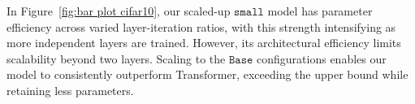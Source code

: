 
In Figure~\ref{fig:bar plot cifar10}, our scaled-up $\texttt{small}$ model has parameter efficiency across varied layer-iteration ratios, with this strength intensifying as more independent layers are trained. However, its architectural efficiency limits scalability beyond two layers. Scaling to the $\texttt{Base}$ configurations enables our model to consistently outperform Transformer, exceeding the upper bound while retaining less parameters.
 


